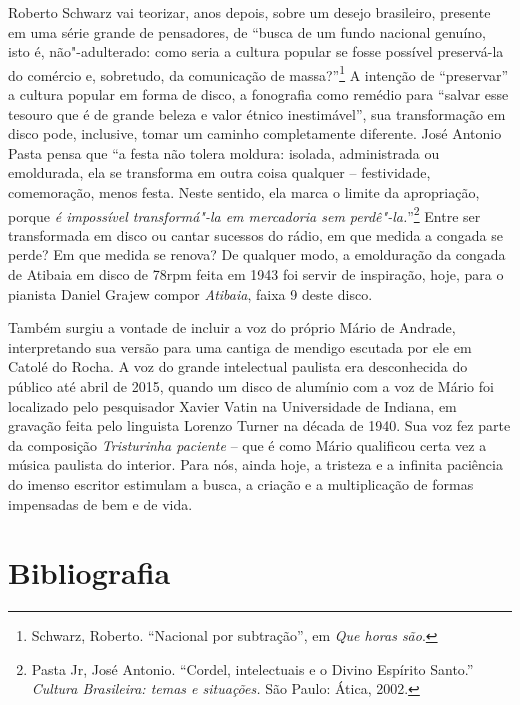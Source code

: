 Roberto Schwarz vai teorizar, anos depois, sobre um desejo brasileiro,
presente em uma série grande de pensadores, de ``busca de um fundo
nacional genuíno, isto é, não"-adulterado: como seria a cultura popular
se fosse possível preservá-la do comércio e, sobretudo, da comunicação
de massa?''\footnote{Schwarz, Roberto. ``Nacional por subtração'', em
  \emph{Que horas são}.} A intenção de ``preservar'' a cultura popular
em forma de disco, a fonografia como remédio para ``salvar esse tesouro
que é de grande beleza e valor étnico inestimável'', sua transformação
em disco pode, inclusive, tomar um caminho completamente diferente. José
Antonio Pasta pensa que ``a festa não tolera moldura: isolada,
administrada ou emoldurada, ela se transforma em outra coisa qualquer --
festividade, comemoração, menos festa. Neste sentido, ela marca o limite
da apropriação, porque \emph{é impossível transformá"-la em mercadoria
sem perdê"-la.}''\footnote{Pasta Jr, José Antonio. ``Cordel, intelectuais
  e o Divino Espírito Santo.'' \emph{Cultura Brasileira: temas e
  situações.} São Paulo: Ática, 2002.} Entre ser transformada em disco
ou cantar sucessos do rádio, em que medida a congada se perde? Em que
medida se renova? De qualquer modo, a emolduração da congada de Atibaia
em disco de 78rpm feita em 1943 foi servir de inspiração, hoje, para o
pianista Daniel Grajew compor \emph{Atibaia}, faixa 9 deste disco.

Também surgiu a vontade de incluir a voz do próprio Mário de Andrade,
interpretando sua versão para uma cantiga de mendigo escutada por ele em
Catolé do Rocha. A voz do grande intelectual paulista era desconhecida
do público até abril de 2015, quando um disco de alumínio com a voz de
Mário foi localizado pelo pesquisador Xavier Vatin na Universidade de
Indiana, em gravação feita pelo linguista Lorenzo Turner na década de
1940. Sua voz fez parte da composição \emph{Tristurinha paciente} -- que
é como Mário qualificou certa vez a música paulista do interior. Para
nós, ainda hoje, a tristeza e a infinita paciência do imenso escritor
estimulam a busca, a criação e a multiplicação de formas impensadas de 
bem e de vida.

\section{Bibliografia}

